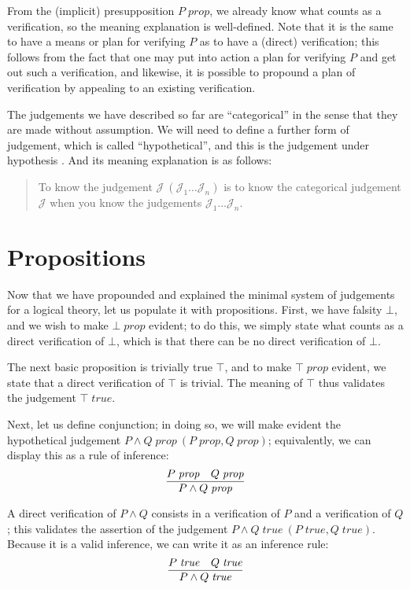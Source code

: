 \documentclass{amsart}
\theoremstyle{definition}
\theoremstyle{remark}
\numberwithin{equation}{section}
\newcommand\isprop[1]{\ensuremath{#1\;\mathit{prop}}}
\newcommand\istrue[1]{\ensuremath{#1\;\mathit{true}}}
\newcommand\hyp[2]{\ensuremath{#1\ (#2)}}
\begin{document}
From the (implicit) presupposition \isprop{P}, we already know what counts as a
verification, so the meaning explanation is well-defined. Note that it is the
same to have a means or plan for verifying $P$ as to have a (direct)
verification; this follows from the fact that one may put into action a plan
for verifying $P$ and get out such a verification, and likewise, it is possible
to propound a plan of verification by appealing to an existing verification.

The judgements we have described so far are ``categorical'' in the sense that
they are made without assumption. We will need to define a further form of
judgement, which is called ``hypothetical'', and this is the judgement under
hypothesis \framebox{\hyp{\mathcal{J}}{\mathcal{J}_1\dots\mathcal{J}_n}}. And
its meaning explanation is as follows:

\begin{quote}
  To know the judgement \hyp{\mathcal{J}}{\mathcal{J}_1\dots\mathcal{J}_n} is to know the
  categorical judgement $\mathcal{J}$ when you know the judgements
  $\mathcal{J}_1\dots\mathcal{J}_n$.
\end{quote}


\section{Propositions}
Now that we have propounded and explained the minimal system of judgements for
a logical theory, let us populate it with propositions. First, we have falsity
$\bot$, and we wish to make \isprop{\bot} evident; to do this, we simply state
what counts as a direct verification of $\bot$, which is that there can be no
direct verification of $\bot$.

The next basic proposition is trivially true $\top$, and to make \isprop{\top}
evident, we state that a direct verification of $\top$ is trivial. The meaning
of $\top$ thus validates the judgement \istrue{\top}.

Next, let us define conjunction; in doing so, we will make evident the
hypothetical judgement \hyp{\isprop{P\land Q}}{\isprop{P},\isprop{Q}};
equivalently, we can display this as a rule of inference:
\[
  \infer{
    \isprop{P\land Q}
  }{
    \isprop{P} &
    \isprop{Q}
  }
\]

A direct verification of $P\land Q$ consists in a verification of $P$
and a verification of $Q$; this validates the assertion of the judgement
\hyp{\istrue{P\land Q}}{\istrue{P},\istrue{Q}}. Because it is a valid
inference, we can write it as an inference rule:
\[
  \infer{
    \istrue{P\land Q}
  }{
    \istrue{P} &
    \istrue{Q}
  }
\]
\end{document}
